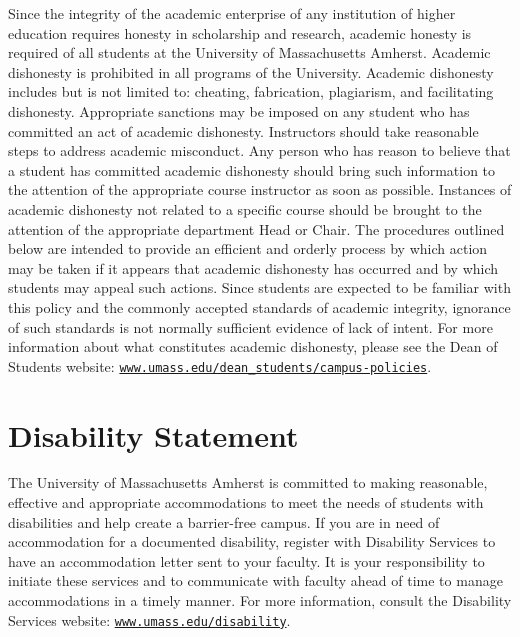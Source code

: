 \documentclass[11pt,letterpaper]{article}
\begin{document}
Since the integrity of the academic enterprise of any institution of higher education requires honesty in scholarship and research, academic honesty is required of all students at the University of Massachusetts Amherst. Academic dishonesty is prohibited in all programs of the University. Academic dishonesty includes but is not limited to: cheating, fabrication, plagiarism, and facilitating dishonesty. Appropriate sanctions may be imposed on any student who has committed an act of academic dishonesty. Instructors should take reasonable steps to address academic misconduct. Any person who has reason to believe that a student has committed academic dishonesty should bring such information to the attention of the appropriate course instructor as soon as possible. Instances of academic dishonesty not related to a specific course should be brought to the attention of the appropriate department Head or Chair. The procedures outlined below are intended to provide an efficient and orderly process by which action may be taken if it appears that academic dishonesty has occurred and by which students may appeal such actions. Since students are expected to be familiar with this policy and the commonly accepted standards of academic integrity, ignorance of such standards is not normally sufficient evidence of lack of intent. For more information about what constitutes academic dishonesty, please see the Dean of Students website: \href{http://www.umass.edu/dean_students/campus-policies}{\texttt{www.umass.edu/dean\_students/campus-policies}}.

\section*{Disability Statement}

The University of Massachusetts Amherst is committed to making reasonable, effective and appropriate accommodations to meet the needs of students with disabilities and help create a barrier-free campus. If you are in need of accommodation for a documented disability, register with Disability Services to have an accommodation letter sent to your faculty. It is your responsibility to initiate these services and to communicate with faculty ahead of time to manage accommodations in a timely manner. For more information, consult the Disability Services website: \href{http://www.umass.edu/disability/}{\texttt{www.umass.edu/disability}}.
\end{document}
